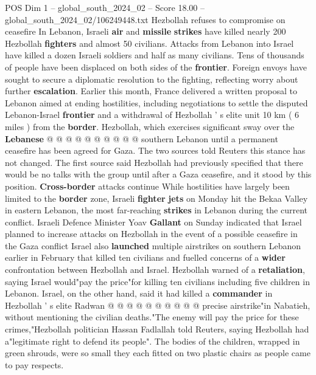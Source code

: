 \begin{textsample}{POS Dim 1 – global\_south\_2024\_02 – Score 18.00 – global\_south\_2024\_02/106249448.txt}
Hezbollah refuses to compromise on ceasefire In Lebanon, Israeli \textbf{air} and \textbf{missile} \textbf{strikes} have killed nearly 200 Hezbollah \textbf{fighters} and almost 50 civilians.
Attacks from Lebanon into Israel have killed a dozen Israeli soldiers and half as many civilians.
Tens of thousands of people have been displaced on both sides of the \textbf{frontier}.
Foreign envoys have sought to secure a diplomatic resolution to the fighting, reflecting worry about further \textbf{escalation}.
Earlier this month, France delivered a written proposal to Lebanon aimed at ending hostilities, including negotiations to settle the disputed Lebanon-Israel \textbf{frontier} and a withdrawal of Hezbollah ' s elite unit 10 km ( 6 miles ) from the \textbf{border}.
Hezbollah, which exercises significant sway over the \textbf{Lebanese} @ @ @ @ @ @ @ @ @ @ southern Lebanon until a permanent ceasefire has been agreed for Gaza.
The two sources told Reuters this stance has not changed.
The first source said Hezbollah had previously specified that there would be no talks with the group until after a Gaza ceasefire, and it stood by this position. \textbf{Cross-border} attacks continue While hostilities have largely been limited to the \textbf{border} zone, Israeli \textbf{fighter} \textbf{jets} on Monday hit the Bekaa Valley in eastern Lebanon, the most far-reaching \textbf{strikes} in Lebanon during the current conflict.
Israeli Defence Minister Yoav \textbf{Gallant} on Sunday indicated that Israel planned to increase attacks on Hezbollah in the event of a possible ceasefire in the Gaza conflict Israel also \textbf{launched} multiple airstrikes on southern Lebanon earlier in February that killed ten civilians and fuelled concerns of a \textbf{wider} confrontation between Hezbollah and Israel.
Hezbollah warned of a \textbf{retaliation}, saying Israel would"pay the price"for killing ten civilians including five children in Lebanon.
Israel, on the other hand, said it had killed a \textbf{commander} in Hezbollah ' s elite Radwan @ @ @ @ @ @ @ @ @ @ precise airstrike"in Nabatieh, without mentioning the civilian deaths."The enemy will pay the price for these crimes,"Hezbollah politician Hassan Fadlallah told Reuters, saying Hezbollah had a"legitimate right to defend its people".
The bodies of the children, wrapped in green shrouds, were so small they each fitted on two plastic chairs as people came to pay respects.

\end{textsample}
